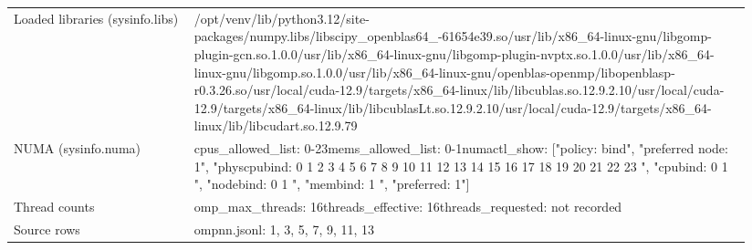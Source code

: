 \begin{longtable}{>{\raggedright\arraybackslash}p{0.23\linewidth}>{\raggedright\arraybackslash}p{0.71\linewidth}}
Loaded libraries (sysinfo.libs) & /\allowbreak{}opt/\allowbreak{}venv/\allowbreak{}lib/\allowbreak{}python3.12/\allowbreak{}site-packages/\allowbreak{}numpy.libs/\allowbreak{}libscipy\_\allowbreak{}openblas64\_\allowbreak{}-61654e39.so\newline /\allowbreak{}usr/\allowbreak{}lib/\allowbreak{}x86\_\allowbreak{}64-linux-gnu/\allowbreak{}libgomp-plugin-gcn.so.1.0.0\newline /\allowbreak{}usr/\allowbreak{}lib/\allowbreak{}x86\_\allowbreak{}64-linux-gnu/\allowbreak{}libgomp-plugin-nvptx.so.1.0.0\newline /\allowbreak{}usr/\allowbreak{}lib/\allowbreak{}x86\_\allowbreak{}64-linux-gnu/\allowbreak{}libgomp.so.1.0.0\newline /\allowbreak{}usr/\allowbreak{}lib/\allowbreak{}x86\_\allowbreak{}64-linux-gnu/\allowbreak{}openblas-openmp/\allowbreak{}libopenblasp-r0.3.26.so\newline /\allowbreak{}usr/\allowbreak{}local/\allowbreak{}cuda-12.9/\allowbreak{}targets/\allowbreak{}x86\_\allowbreak{}64-linux/\allowbreak{}lib/\allowbreak{}libcublas.so.12.9.2.10\newline /\allowbreak{}usr/\allowbreak{}local/\allowbreak{}cuda-12.9/\allowbreak{}targets/\allowbreak{}x86\_\allowbreak{}64-linux/\allowbreak{}lib/\allowbreak{}libcublasLt.so.12.9.2.10\newline /\allowbreak{}usr/\allowbreak{}local/\allowbreak{}cuda-12.9/\allowbreak{}targets/\allowbreak{}x86\_\allowbreak{}64-linux/\allowbreak{}lib/\allowbreak{}libcudart.so.12.9.79 \\
NUMA (sysinfo.numa) & cpus\_\allowbreak{}allowed\_\allowbreak{}list: 0-23\newline mems\_\allowbreak{}allowed\_\allowbreak{}list: 0-1\newline numactl\_\allowbreak{}show: ["policy: bind", "preferred node: 1", "physcpubind: 0 1 2 3 4 5 6 7 8 9 10 11 12 13 14 15 16 17 18 19 20 21 22 23 ", "cpubind: 0 1 ", "nodebind: 0 1 ", "membind: 1 ", "preferred: 1"] \\
Thread counts & omp\_\allowbreak{}max\_\allowbreak{}threads: 16\newline threads\_\allowbreak{}effective: 16\newline threads\_\allowbreak{}requested: not recorded \\
Source rows & ompnn.jsonl: 1, 3, 5, 7, 9, 11, 13 \\
\end{longtable}
